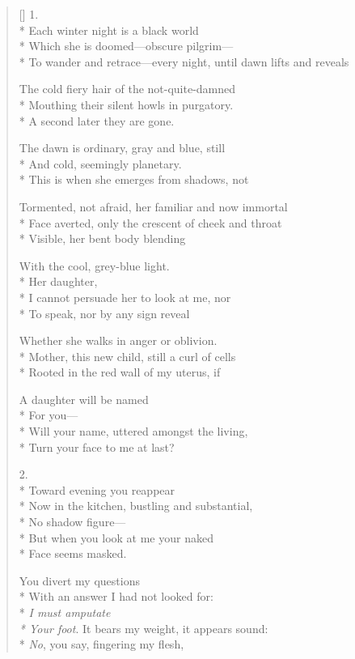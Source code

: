 \label{ch:threedreams}
\settowidth{\versewidth}{To wander and retrace---every night, until dawn lifts and reveals}
\begin{verse}[\versewidth]
1.\\*
Each winter night is a black world\\*
Which she is doomed---obscure pilgrim---\\*
To wander and retrace---every night, until dawn lifts and reveals

The cold fiery hair of the not-quite-damned\\*
Mouthing their silent howls in purgatory.\\*
\qquad A second later they are gone.

The dawn is ordinary, gray and blue, still\\*
And cold, seemingly planetary.\\*
This is when she emerges from shadows, not 

Tormented, not afraid, her familiar and now immortal\\*
Face averted, only the crescent of cheek and throat\\*
Visible, her bent body blending

With the cool, grey-blue light.\\*
\hspace*{5\vgap} Her daughter,\\*
I cannot persuade her to look at me, nor\\*
To speak, nor by any sign reveal

Whether she walks in anger or oblivion.\\*
Mother, this new child, still a curl of cells\\*
Rooted in the red wall of my uterus, if

A daughter will be named\\*
For you---\\*
\hfill Will your name, uttered amongst the living,\\*
Turn your face to me at last?

2.\\*
Toward evening you reappear\\*
Now in the kitchen, bustling and substantial,\\*
No shadow figure---\\*
But when you look at me your naked \\*
Face seems masked.

You divert my questions\\*
With an answer I had not looked for:\\*
\textit{I must amputate \\*
Your foot}. It bears my weight, it appears sound:\\*
\textit{No}, you say, fingering my flesh,


\end{verse}
